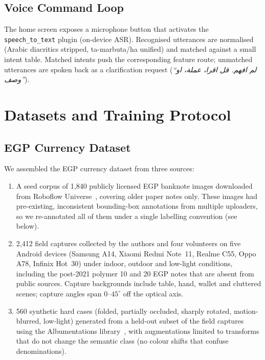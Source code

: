 \documentclass[11pt,a4paper]{article}
\begin{document}
\subsection{Voice Command Loop}

The home screen exposes a microphone button that activates the
\texttt{speech\_to\_text} plugin (on-device ASR). Recognised utterances
are normalised (Arabic diacritics stripped, ta-marbuta/ha unified) and
matched against a small intent table. Matched intents push the
corresponding feature route; unmatched utterances are spoken back as a
clarification request (\emph{``لم افهم. قل اقرا، عملة، او وصف''}).

\section{Datasets and Training Protocol}
\label{sec:dataset}

\subsection{EGP Currency Dataset}
\label{sec:egp_dataset}

We assembled the EGP currency dataset from three sources:

\begin{enumerate}
\item A seed corpus of 1{,}840 publicly licensed EGP banknote images
downloaded from Roboflow Universe~\cite{roboflow_universe},
covering older paper notes only. These images had pre-existing,
inconsistent bounding-box annotations from multiple uploaders, so
we re-annotated all of them under a single labelling convention
(see below).
\item 2{,}412 field captures collected by the authors and four
volunteers on five Android devices (Samsung A14, Xiaomi Redmi
Note~11, Realme C55, Oppo A78, Infinix Hot~30) under indoor,
outdoor and low-light conditions, including the post-2021 polymer
10 and 20 EGP notes that are absent from public sources. Capture
backgrounds include table, hand, wallet and cluttered scenes;
capture angles span $0$--$45^{\circ}$ off the optical axis.
\item 560 synthetic hard cases (folded, partially occluded, sharply
rotated, motion-blurred, low-light) generated from a held-out
subset of the field captures using the Albumentations
library~\cite{albumentations}, with augmentations limited to
transforms that do not change the semantic class (no colour
shifts that confuse denominations).
\end{enumerate}
\end{document}
